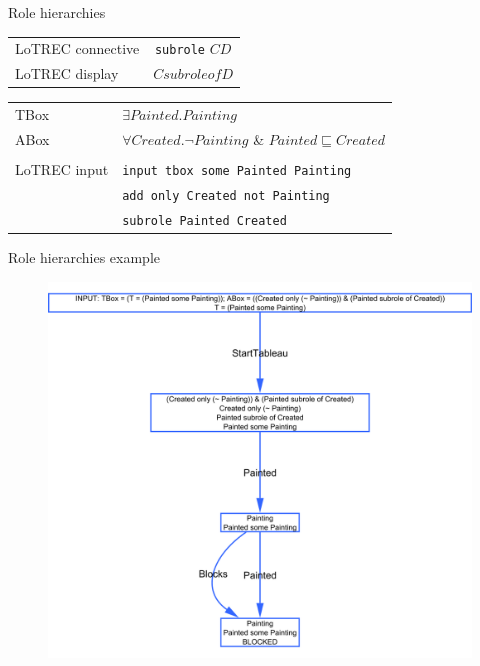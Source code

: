\documentclass{beamer}
\begin{document}
\begin{frame}{Role hierarchies}

\begin{table}[h]
\begin{center}
\begin{tabular}{l c}
LoTREC connective & \texttt{subrole} $C D$ \\
LoTREC display & $C subrole of D$ \\
\end{tabular}
\end{center}
\end{table}

\begin{table}[h]
\begin{center}
\begin{tabular}{l l}
TBox & $\exists{}Painted.Painting$ \\
ABox & $\forall{}Created.\neg{}Painting$ \& $Painted\sqsubseteq{}Created$ \\
\\
LoTREC input & \texttt{input tbox some Painted Painting} \\
 & \texttt{add only Created not Painting}\\
 & \texttt{subrole Painted Created} \\
\end{tabular}
\end{center}
\end{table}

\end{frame}

\begin{frame}{Role hierarchies example}

\begin{figure}
\begin{center}
\includegraphics[scale=0.24]{premodelzondersubrole}
\end{center}
\end{figure}

\end{frame}
\end{document}
